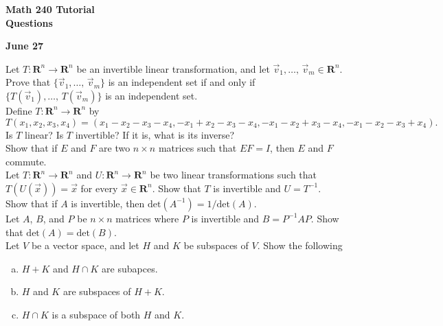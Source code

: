 \documentclass[a4paper,11pt]{article}
\newcommand{\R}{\mathbf{R}}
\begin{document}
\begin{center}
  {\Large\bfseries Math 240 Tutorial \\ Questions}
\end{center}
\begin{center}
  {\bfseries June 27}
\end{center}

 Let $T : \R^n \rightarrow \R^n$ be an invertible
linear transformation, and let $\vec v_1,\dots,\,\vec v_m \in \R^n$. Prove
that $\{\vec v_1,\dots,\,\vec v_m\}$ is an independent set if and only if
$\{T(\vec v_1),\dots,\,T(\vec v_m)\}$ is an independent set. \\

 Define $T : \R^n \rightarrow \R^n$ by
\[
  T(x_1,x_2,x_3,x_4) =
  (x_1-x_2-x_3-x_4, -x_1+x_2-x_3-x_4,-x_1-x_2+x_3-x_4,-x_1-x_2-x_3+x_4).
\]
Is $T$ linear? Is $T$ invertible? If it is, what is its inverse? \\

 Show that if $E$ and $F$ are two $n \times n$
matrices such that $EF=I$, then $E$ and $F$ commute.  \\

 Let $T : \R^n \rightarrow \R^n$ and $U : \R^n
\rightarrow \R^n$ be two linear transformations such that $T(U(\vec x))=\vec x$
for every $\vec x \in \R^n$. Show that $T$ is invertible and $U=T^{-1}$. \\

 Show that if $A$ is invertible, then
$\text{det}(A^{-1}) = 1/\text{det}(A)$. \\

 Let $A$, $B$, and $P$ be $n \times n$ matrices
where $P$ is invertible and $B = P^{-1}AP$. Show that
$\text{det}(A)=\text{det}(B)$.  \\

 Let $V$ be a vector space, and let $H$ and $K$ be
subspaces of $V$. Show the following
\begin{enumerate}[(a)]
\item $H+K$ and $H \cap K$ are subapces.
\item $H$ and $K$ are subspaces of $H+K$.
\item $H \cap K$ is a subspace of both $H$ and $K$. \\
\end{enumerate}
\end{document}
